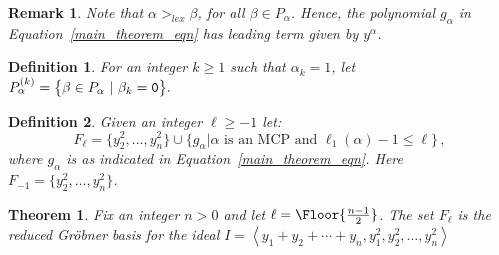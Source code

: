\documentclass[10pt,a4paper]{article}
\newtheorem{definition}{Definition}[section]
\newtheorem{theorem}{Theorem}[section]
\newtheorem{remark}{Remark}[section]
\DeclarePairedDelimiter\Floor\lfloor\rfloor
\DeclareMathOperator{\la}{\langle}
\DeclareMathOperator{\ra}{\rangle}
\begin{document}
\begin{remark}\label{rem:lex}
	Note that $\alpha >_{lex} \beta$, for all  $ \beta \in P_{\alpha}$. Hence, the polynomial $g_\alpha$ in Equation~\eqref{main_theorem_eqn} has leading term given by $y^\alpha$.
\end{remark}
\begin{definition} \label{p_alpha_k}
	For an integer $k \geq 1$ such that $\alpha_k=1$, let
		$P_\alpha^{(k)} = \big\{\beta  \in P_\alpha \ | \ \beta_k = \textnormal{\texttt{0}}\big\}.$
\end{definition}
\begin{definition} \label{F_ell}
	Given an integer $\ell \ge -1$ let:
	\begin{equation*}
		F_\ell = \big\{ y^2_2, \dots, y^2_n\big\} \cup \big\{ g_{\alpha} \big|  \alpha \text{ is an MCP and } \ell_1(\alpha)-1 \leq \ell \big\} \,,
	\end{equation*}
	where $g_\alpha$ is as indicated in Equation~\eqref{main_theorem_eqn}. Here $F_{-1}= \big\{ y^2_2, \dots, y^2_n\big\}$.
\end{definition}
\begin{theorem} 
\label{main_theorem2}
    Fix an integer $n>0$ and let $\ell = \Floor{\frac{n-1}{2}}$. The set $F_\ell$ is the reduced Gr\"obner basis for the ideal $I = \la y_1 + y_2 + \cdots + y_n, y_1^2, y_2^2, \dots, y_n^2 \ra$
    \end{theorem}

\end{document}
